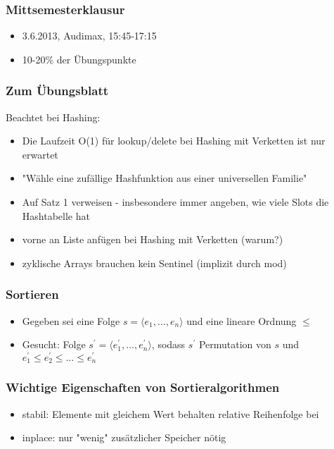 

\begin{frame}
  \titlepage
\end{frame}

\begin{frame}
\frametitle{Mittsemesterklausur}
\begin{itemize}
\item 3.6.2013, Audimax, 15:45-17:15
\item 10-20\% der Übungspunkte
\end{itemize}
\end{frame}

\begin{frame}
\frametitle{Zum Übungsblatt}
Beachtet bei Hashing:
\begin{itemize}
\item Die Laufzeit O(1) für lookup/delete bei Hashing mit Verketten ist nur erwartet
\item "Wähle eine zufällige Hashfunktion aus einer universellen Familie"
\item Auf Satz 1 verweisen - insbesondere immer angeben, wie viele Slots die Hashtabelle hat
\item vorne an Liste anfügen bei Hashing mit Verketten (warum?)
\item zyklische Arrays brauchen kein Sentinel (implizit durch mod)
\end{itemize}
\end{frame}

\begin{frame}
\frametitle{Sortieren}
\begin{itemize}
\item Gegeben sei eine Folge $s=\langle e_1,\ldots,e_n\rangle$ und eine lineare Ordnung $\leq$
\item Gesucht: Folge $s^\prime=\langle e_1^\prime,\ldots,e_n^\prime\rangle$, sodass $s^\prime$ Permutation von $s$ und $e_1^\prime\leq e_2^\prime\leq\ldots\leq e_n^\prime$
\end{itemize}
\end{frame}

\begin{frame}
\frametitle{Wichtige Eigenschaften von Sortieralgorithmen}
\begin{itemize}
\item stabil: Elemente mit gleichem Wert behalten relative Reihenfolge bei
\item inplace: nur "wenig" zusätzlicher Speicher nötig
\end{itemize}
\end{frame}

